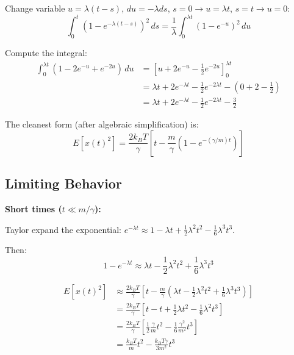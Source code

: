 \documentclass[11pt,a4paper]{article}
\begin{document}
	Change variable $u = \lambda(t-s)$, $du = -\lambda ds$, $s = 0 \to u = \lambda t$, $s = t \to u = 0$:
	\begin{equation}
		\int_0^t (1 - e^{-\lambda(t-s)})^2 \, ds = \frac{1}{\lambda} \int_0^{\lambda t} (1 - e^{-u})^2 \, du
	\end{equation}
	
	Compute the integral:
	\begin{align}
		\int_0^{\lambda t} (1 - 2e^{-u} + e^{-2u}) \, du &= \left[ u + 2e^{-u} - \frac{1}{2}e^{-2u} \right]_0^{\lambda t} \\
		&= \lambda t + 2e^{-\lambda t} - \frac{1}{2}e^{-2\lambda t} - \left(0 + 2 - \frac{1}{2}\right) \\
		&= \lambda t + 2e^{-\lambda t} - \frac{1}{2}e^{-2\lambda t} - \frac{3}{2}
	\end{align}
	
	The cleanest form (after algebraic simplification) is:
	\begin{equation}
		\boxed{E[x(t)^2] = \frac{2k_B T}{\gamma} \left[ t - \frac{m}{\gamma}\left(1 - e^{-(\gamma/m)t}\right) \right]}
	\end{equation}
	
	\subsection{Limiting Behavior}
	
	\textbf{Short times ($t \ll m/\gamma$):}
	
	Taylor expand the exponential: $e^{-\lambda t} \approx 1 - \lambda t + \frac{1}{2}\lambda^2 t^2 - \frac{1}{6}\lambda^3 t^3$.
	
	Then:
	\begin{equation}
		1 - e^{-\lambda t} \approx \lambda t - \frac{1}{2}\lambda^2 t^2 + \frac{1}{6}\lambda^3 t^3
	\end{equation}
	
	\begin{align}
		E[x(t)^2] &\approx \frac{2k_B T}{\gamma} \left[ t - \frac{m}{\gamma}\left(\lambda t - \frac{1}{2}\lambda^2 t^2 + \frac{1}{6}\lambda^3 t^3\right) \right] \\
		&= \frac{2k_B T}{\gamma} \left[ t - t + \frac{1}{2}\lambda t^2 - \frac{1}{6}\lambda^2 t^3 \right] \\
		&= \frac{2k_B T}{\gamma} \left[ \frac{1}{2}\frac{\gamma}{m} t^2 - \frac{1}{6}\frac{\gamma^2}{m^2} t^3 \right] \\
		&= \frac{k_B T}{m} t^2 - \frac{k_B T \gamma}{3 m^2} t^3
	\end{align}
	
\end{document}
